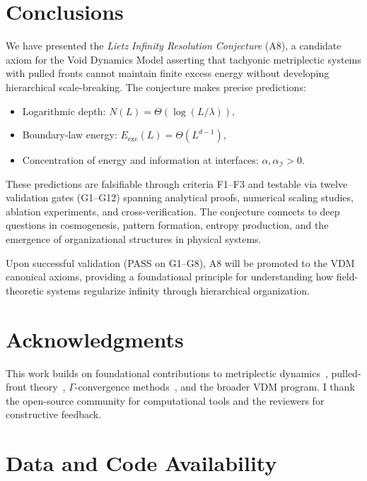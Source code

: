 \documentclass{article}
\begin{document}
\section{Conclusions}
\label{sec:conclusions}

We have presented the \emph{Lietz Infinity Resolution Conjecture} (A8), a candidate axiom for the Void Dynamics Model asserting that tachyonic metriplectic systems with pulled fronts cannot maintain finite excess energy without developing hierarchical scale-breaking. The conjecture makes precise predictions:
\begin{itemize}[noitemsep]
\item Logarithmic depth: $N(L) = \Theta(\log(L/\lambda))$,
\item Boundary-law energy: $E_{\text{exc}}(L) = \Theta(L^{d-1})$,
\item Concentration of energy and information at interfaces: $\alpha, \alpha_{\mathcal{I}} > 0$.
\end{itemize}

These predictions are falsifiable through criteria F1--F3 and testable via twelve validation gates (G1--G12) spanning analytical proofs, numerical scaling studies, ablation experiments, and cross-verification. The conjecture connects to deep questions in cosmogenesis, pattern formation, entropy production, and the emergence of organizational structures in physical systems.

Upon successful validation (PASS on G1--G8), A8 will be promoted to the VDM canonical axioms, providing a foundational principle for understanding how field-theoretic systems regularize infinity through hierarchical organization.

\section*{Acknowledgments}

This work builds on foundational contributions to metriplectic dynamics~\cite{morrison1984bracket,grmela1997dynamics}, pulled-front theory~\cite{vanSaarloos2003,ebert1997front}, $\Gamma$-convergence methods~\cite{modica1977gradient}, and the broader VDM program. I thank the open-source community for computational tools and the reviewers for constructive feedback.

\section*{Data and Code Availability}
\end{document}
